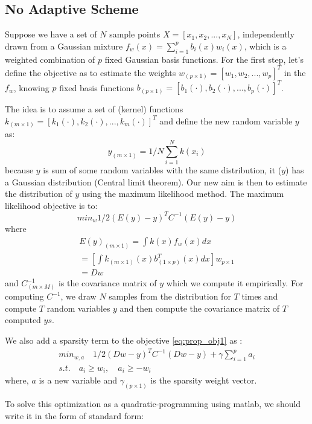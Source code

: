 \subsection{No Adaptive Scheme}\label{sec:noadapt}
Suppose we have a set of $N$ sample points $X = [x_1, x_2, ..., x_N]$, independently drawn from a Gaussian mixture $f_w(x) = \sum_{i = 1}^p b_i(x)w_i(x)$, which is a weighted combination of $p$ fixed Gaussian basis functions. For the first step, let's define the objective as to estimate the weights $w_{(p \times 1)} = [w_1, w_2, ..., w_p]^T$ in the $f_w$, knowing $p$ fixed basis functions $b_{(p\times 1)} = [b_1(\cdot), b_2(\cdot), ..., b_p(\cdot)]^T$.\par
The idea is to assume a set of (kernel) functions $k_{(m \times 1)} = [k_1(\cdot), k_2(\cdot),..., k_m(\cdot)]^T$ and define the new random variable $y$ as:
\begin{equation}
    y_{(m \times 1)} = 1/N \sum_{i=1}^N k(x_i)
\end{equation}
because $y$ is sum of some random variables with the same distribution, it ($y$) has a Gaussian distribution (Central limit theorem). Our new aim is then to estimate the distribution of $y$ using the maximum likelihood method. The maximum likelihood objective is to:
\begin{equation} \label{eq:prop_obj1}
    min_{w} 1/2(E(y) - y)^TC^{-1}(E(y) - y)
\end{equation}
where
\begin{align}
    E(y)_{(m \times 1)} = \int k(x)f_w(x) dx \\
    = \left[\int k_{(m \times 1)}(x)b^T_{(1 \times p)}(x)dx \right]w_{{p \times1}} \\
    =Dw
\end{align}
and $C^{-1}_{(m \times M)}$ is the covariance matrix of $y$ which we compute it empirically. For computing $C^{-1}$, we draw $N$ samples from the distribution for $T$ times and compute $T$ random variables $y$ and then compute the covariance matrix of $T$ computed $ys$. \par
 We also add a sparsity term to the objective \eqref{eq:prop_obj1} as :
 \begin{align}
     min_{w,a} \quad 1/2(Dw - y)^TC^{-1}(Dw - y) +\gamma \sum_{i = 1}^p a_i \\
     s. t. \quad a_i \geq w_i, \quad a_i \geq -w_i
 \end{align}
where, $a$ is a new variable and $\gamma_{(p \times 1)}$ is the sparsity weight vector.\par To solve this optimization as a quadratic-programming using matlab, we should write it in the form of standard form:
